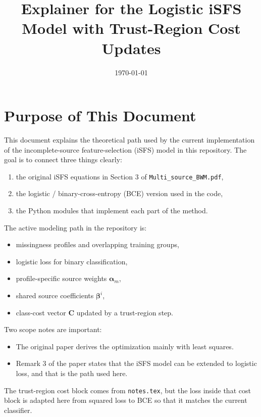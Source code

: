 \documentclass[11pt]{article}
\title{Explainer for the Logistic iSFS Model with Trust-Region Cost Updates}
\author{}
\date{\today}
\newcommand{\alpham}{\boldsymbol{\alpha}_m}
\newcommand{\betai}{\boldsymbol{\beta}^i}
\newcommand{\costvec}{\mathbf{C}}
\begin{document}
\maketitle
\tableofcontents

\section{Purpose of This Document}

This document explains the theoretical path used by the current implementation
of the incomplete-source feature-selection (iSFS) model in this repository.
The goal is to connect three things clearly:

\begin{enumerate}
  \item the original iSFS equations in Section 3 of \texttt{Multi\_source\_BWM.pdf},
  \item the logistic / binary-cross-entropy (BCE) version used in the code,
  \item the Python modules that implement each part of the method.
\end{enumerate}

The active modeling path in the repository is:

\begin{itemize}
  \item missingness profiles and overlapping training groups,
  \item logistic loss for binary classification,
  \item profile-specific source weights $\alpham$,
  \item shared source coefficients $\betai$,
  \item class-cost vector $\costvec$ updated by a trust-region step.
\end{itemize}

Two scope notes are important:

\begin{itemize}
  \item The original paper derives the optimization mainly with least squares.
  \item Remark 3 of the paper states that the iSFS model can be extended to
  logistic loss, and that is the path used here.
\end{itemize}

The trust-region cost block comes from \texttt{notes.tex}, but the loss inside
that cost block is adapted here from squared loss to BCE so that it matches the
current classifier.
\end{document}
